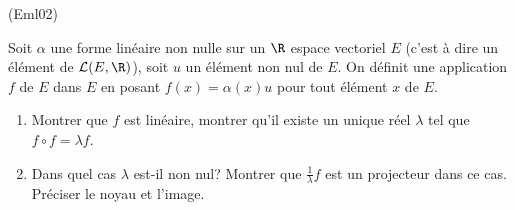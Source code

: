\begin{tiny}(Eml02)\end{tiny}
Soit $\alpha $ une forme lin{\'e}aire non nulle sur un $\R$ espace vectoriel $E$ (c'est {\`a} dire un {\'e}l{\'e}ment de $\mathcal{L}(E,\R)$), soit $u$ un {\'e}l{\'e}ment non nul de $E$. On d{\'e}finit une application $f$ de $E$ dans $E$ en posant $f(x)=\alpha (x)u$ pour tout {\'e}l{\'e}ment $x$ de $E$.
  \begin{enumerate}
    \item Montrer que $f$ est lin{\'e}aire, montrer qu'il existe un unique r{\'e}el $\lambda $ tel que $f\circ f=\lambda f$.
    \item Dans quel cas $\lambda $ est-il non nul? Montrer que $\frac{1}{\lambda }f$ est un projecteur dans ce cas. Pr{\'e}ciser le noyau et l'image.
  \end{enumerate}